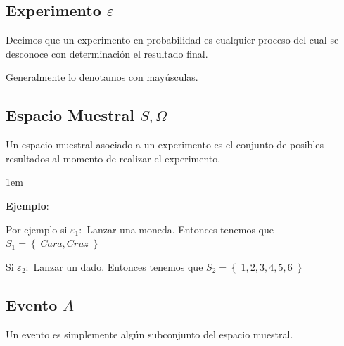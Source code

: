 \documentclass[12pt, fleqn]{report}                             %
\newenvironment{SmallIndentation}[1][0.75em]                    %
        {\begin{adjustwidth}{#1}{}\begin{footnotesize}}             %
        {\end{footnotesize}\end{adjustwidth}}                       %
\theoremstyle{break}                                            %
\newcommand{\Set}[1]            {\left\{ \; #1 \; \right\}}     %
\begin{document}
            \subsection{Experimento $\varepsilon$}

                Decimos que un experimento en probabilidad es cualquier proceso del cual se desconoce
                con determinación el resultado final.

                Generalmente lo denotamos con mayúsculas.



            \vspace{1em}
            \subsection{Espacio Muestral $S, \Omega$}

                Un espacio muestral asociado a un experimento es el conjunto de posibles resultados al
                momento de realizar el experimento.

                 \begin{SmallIndentation}[1em]
                     \textbf{Ejemplo}:
                     
                    Por ejemplo si $\varepsilon_1:$ Lanzar una moneda.
                    Entonces tenemos que $S_1 = \Set{Cara, Cruz}$ 

                    Si $\varepsilon_2:$ Lanzar un dado.
                    Entonces tenemos que $S_2 = \Set{1, 2, 3, 4, 5, 6}$ 
                 
                 \end{SmallIndentation}


            \vspace{1em}
            \subsection{Evento $A$}

                Un evento es simplemente algún subconjunto del espacio muestral.
\end{document}

